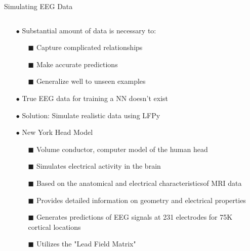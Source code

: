 \documentclass[aspectratio=169]{beamer}
\begin{document}
\begin{frame}{Simulating EEG Data}
    \begin{columns}
        \begin{column}{0.5\textwidth}
            \begin{itemize}[leftmargin=1em,labelindent=\dimexpr1em-]
                \item[$\bullet$] \footnotesize Substantial amount of data is necessary to:
                \begin{itemize}
                    \item[\tiny$\blacksquare$] \scriptsize Capture complicated relationships
                    \item[\tiny$\blacksquare$] \scriptsize Make accurate predictions
                    \item[\tiny$\blacksquare$] \scriptsize Generalize well to unseen examples
                \end{itemize}
                \item[$\bullet$] \footnotesize True EEG data for training a NN doesn't exist
                \item[$\bullet$] \footnotesize Solution: Simulate realistic data using LFPy
                \item[$\bullet$] \footnotesize New York Head Model
                \begin{itemize}
                    \item[\tiny$\blacksquare$] \scriptsize Volume conductor, computer model of the human head
                    \item[\tiny$\blacksquare$] \scriptsize Simulates electrical activity in the brain
                    \item[\tiny$\blacksquare$] \scriptsize Based on the anatomical and electrical characteristicsof MRI data
                    \item[\tiny$\blacksquare$] \scriptsize Provides detailed information on geometry and electrical properties
                    \item[\tiny$\blacksquare$] \scriptsize Generates predictions of EEG signals at 231 electrodes for 75K cortical locations
                    \item[\tiny$\blacksquare$] \scriptsize Utilizes the "Lead Field Matrix"
                \end{itemize}
            \end{itemize}
        \end{column}
        \begin{column}{0.5\textwidth}

\end{column}
\end{columns}
\end{frame}
\end{document}
